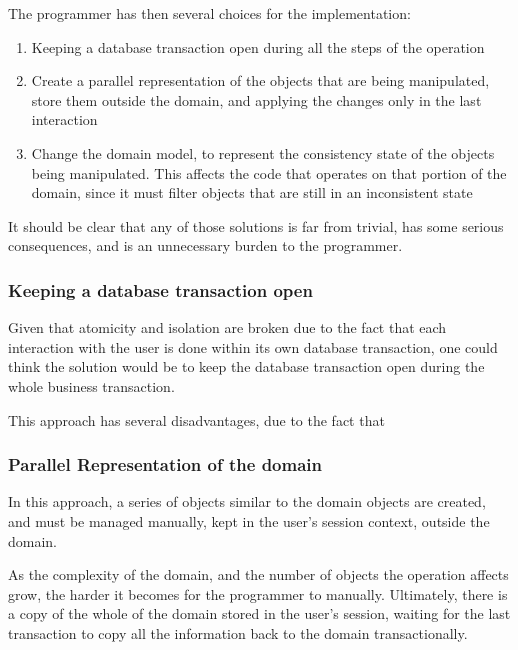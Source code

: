\documentclass{llncs}
\begin{document}
The programmer has then several choices for the implementation:

\begin{enumerate}
\item Keeping a database transaction open during all the steps of the
  operation

\item Create a parallel representation of the objects that are being
  manipulated, store them outside the domain, and applying the changes
  only in the last interaction

\item Change the domain model, to represent the consistency state of
  the objects being manipulated. This affects the code that operates
  on that portion of the domain, since it must filter objects that are
  still in an inconsistent state
\end{enumerate}

It should be clear that any of those solutions is far from trivial,
has some serious consequences, and is an unnecessary burden to the
programmer. 

\subsubsection{Keeping a database transaction open}

Given that atomicity and isolation are broken due to the fact that
each interaction with the user is done within its own database
transaction, one could think the solution would be to keep the
database transaction open during the whole business transaction.

This approach has several disadvantages, due to the fact that 

\subsubsection{Parallel Representation of the domain}

In this approach, a series of objects similar to the domain objects
are created, and must be managed manually, kept in the user's session
context, outside the domain.

As the complexity of the domain, and the number of objects the
operation affects grow, the harder it becomes for the programmer to
manually. Ultimately, there is a copy of the whole of the domain
stored in the user's session, waiting for the last transaction to copy
all the information back to the domain transactionally.
\end{document}
